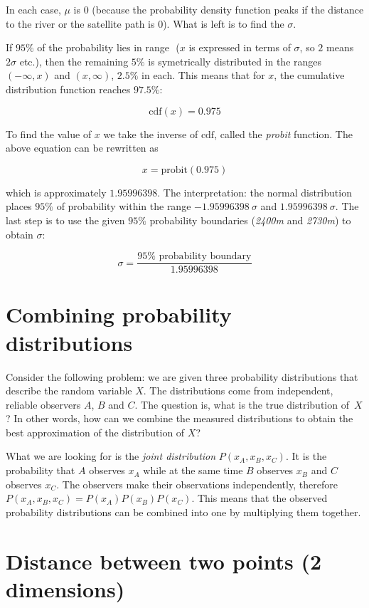 \documentclass[a4paper,12pt]{article}
\begin{document}
In each case, \(\mu\) is \(0\) (because the probability density function peaks if the distance
to the river or the satellite path is \(0\)). What is left is to find the \(\sigma\).

If \(95\%\) of the probability lies in range \(<-x, x>\) (\(x\) is expressed in terms of \(\sigma\), so \(2\) means \(2\sigma\) etc.),
then the remaining \(5\%\) is symetrically distributed in the ranges \((-\infty, x)\) and \((x, \infty)\), \(2.5\%\) in each.
This means that for \(x\), the cumulative distribution function reaches \(97.5\%\):

\[\mbox{cdf}(x) = 0.975\]

To find the value of \(x\) we take the inverse of \(\mbox{cdf}\), called the \emph{probit} function. The above equation can
be rewritten as

\[x = \mbox{probit}(0.975)\]

which is approximately \(1.95996398\). The interpretation: the normal distribution places \(95\%\) of probability
within the range \(-1.95996398\: \sigma\) and \(1.95996398\: \sigma\).
The last step is to use the given \(95\%\) probability boundaries (\emph{2400m} and \emph{2730m})
to obtain \(\sigma\):

\[\sigma = \frac{\mbox{\(95\%\) probability boundary}}{1.95996398}\]

\section{Combining probability distributions}

Consider the following problem: we are given three probability distributions that describe the random variable \(X\).
The distributions come from independent, reliable observers \(A\), \(B\) and \(C\).
The question is, what is the true distribution of~\(X\)?
In other words, how can we combine the measured distributions to obtain the best approximation of the distribution of \(X\)?

What we are looking for is the \emph{joint distribution} \(P(x_A, x_B, x_C)\). It is the probability that \(A\) observes \(x_A\)
while at the same time \(B\) observes \(x_B\) and \(C\) observes \(x_C\). The observers make their observations independently,
therefore \(P(x_A, x_B, x_C) = P(x_A)P(x_B)P(x_C)\). This means that the observed probability distributions can be
combined into one by multiplying them together.

\section{Distance between two points (2 dimensions)}
\end{document}
